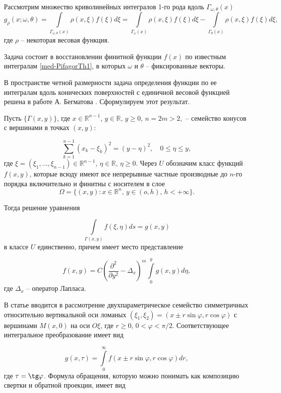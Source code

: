 Рассмотрим множество криволинейных интегралов 1-го рода вдоль $\Gamma_{\omega, \theta}(x)$
\begin{equation}
\label{med-PifagorTh1}
g_\rho(x;\omega,\theta)=\int\limits_{\Gamma_{\omega, \theta}(x)} \rho(x,\xi)f(\xi)d\xi=\int\limits_{\Gamma_{\omega}(x)} \rho(x,\xi)f(\xi)d\xi-\int\limits_{\Gamma_{\theta}(x)} \rho(x,\xi)f(\xi)d\xi,
\end{equation}
где $\rho$ -- некоторая весовая функция.


Задача состоит в восстановлении финитной функции $f(x)$ по известным интегралам \eqref{med-PifagorTh1}, в которых $\omega$ и $\theta$ -- фиксированные векторы.

В пространстве четной размерности задача определения функции по ее интегралам вдоль конических поверхностей с единичной весовой функцией решена в работе А. Бегматова \cite{med-metka3}. Сформулируем этот результат.

Пусть $\{\Gamma(x,y)\}$, где $x\in \mathbb R^{n-1}, \, y\in\mathbb R, \, y\geq0,\, n=2m>2,$ -- семейство конусов с вершинами в точках $(x,y)$:

$$\sum\limits_{k=1}^{n-1}(x_k-\xi_k)^2=(y-\eta)^2, \quad 0\leq\eta\leq y,$$
где $\xi=(\xi_1,\ldots,\xi_{n-1})\in\mathbb R^{n-1},\, \eta\in\mathbb R, \, \eta\geq0$. Через $U$ обозначим класс функций $f(x,y)$, которые всюду имеют все непрерывные частные производные до $n$-го порядка включительно и финитны с носителем в слое
$$\Omega=\{(x,y): x\in \mathbb R^n,\, y\in (o,h), \, h<+\infty\}.$$

Тогда решение уравнения

$$\int\limits_{\Gamma(x,y)}f(\xi,\eta)ds=g(x,y)$$
в классе $U$ единственно, причем имеет место представление

\begin{equation}
\label{med-PifagorTh0}
f(x,y)=C\left(\frac{\partial^2}{\partial y^2}-\Delta_x\right)^m\int\limits_0^y g(x,y)d\eta,\end{equation}
где $\Delta_x$ -- оператор Лапласа.


В статье \cite{med-metka4}  вводится в рассмотрение  двухпараметрическое семейство симметричных относительно вертикальной оси ломаных $(\xi_1,\xi_2)=(x\pm r \sin\varphi, r \cos\varphi)$ с вершинами $M(x,0)$ на оси $O\xi$, где $r\geq0,\, 0<\varphi<\pi/2$. Соответствующее интегральное преобразование имеет вид

$$g(x,\tau)=\int\limits_0^\infty f(x\pm r\sin\varphi, r\cos\varphi)dr,$$
где $\tau=\tg\varphi$. Формула обращения, которую можно понимать как композицию свертки и обратной проекции, имеет вид

